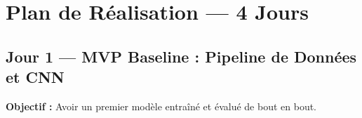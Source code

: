 \documentclass[12pt,a4paper]{article}
\begin{document}
\newpage
\section{Plan de Réalisation — 4 Jours}

\subsection{Jour 1 — MVP Baseline : Pipeline de Données et CNN}

\begin{daybox}
\textbf{Objectif :} Avoir un premier modèle entraîné et évalué de bout en bout.
\end{daybox}

\vspace{0.4cm}
\end{document}

